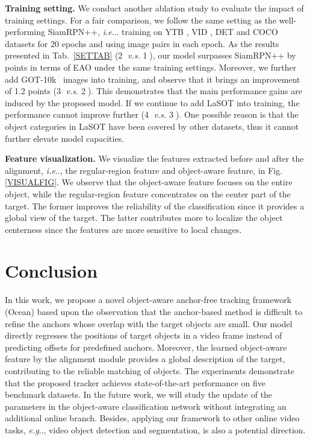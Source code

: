 \documentclass[runningheads]{llncs}
\makeatletter
\DeclareRobustCommand\onedot{\futurelet\@let@token\@onedot}
\def\@onedot{\ifx\@let@token.\else.\null\fi\xspace}
\def\eg{\emph{e.g}\onedot} \def\Eg{\emph{E.g}\onedot}
\def\ie{\emph{i.e}\onedot} \def\Ie{\emph{I.e}\onedot}
\makeatother
\begin{document}
\noindent\textbf{Training setting.} We conduct another ablation study to evaluate the impact of training settings. For a fair comparison, we follow the same setting as the well-performing SiamRPN++\cite{SiamRPN++}, \ie. training on YTB \cite{YTB}, VID \cite{ImageNet}, DET \cite{ImageNet} and COCO \cite{COCO} datasets for 20 epochs and using  image pairs in each epoch. As the results presented in Tab.~\ref{SETTAB} (\textcircled{2} \textit{v.s.} \textcircled{1}), our model surpasses SiamRPN++ by  points in terms of EAO under the same training settings. Moreover, we further add GOT-10k~\cite{GOT10K} images into training, and observe that it brings an improvement of 1.2 points (\textcircled{3} \textit{v.s.} \textcircled{2}). This demonstrates that the main performance gains are induced by the proposed model. If we continue to add LaSOT\cite{LASOT} into training, the performance cannot improve further (\textcircled{4} \textit{v.s.} \textcircled{3}). One possible reason is that the object categories in LaSOT \cite{LASOT} have been covered by other datasets, thus it cannot further elevate model capacities.


\noindent\textbf{Feature visualization.} We visualize the features extracted before and after the alignment, \ie, the regular-region feature and object-aware feature, in Fig. \ref{VISUALFIG}.  We observe that the object-aware feature focuses on the entire object, while the regular-region feature concentrates on the center part of the target. The former improves the reliability of the classification since it provides a global view of the target. The latter contributes more to localize the object centerness since the features are more sensitive to local changes.






\section{Conclusion} \label{Sec6}
In this work, we propose a novel object-aware anchor-free tracking framework (Ocean) based upon the observation that the anchor-based method is difficult to refine the anchors whose overlap with the target objects are small. Our model directly regresses the positions of target objects in a video frame instead of predicting offsets for predefined anchors.  Moreover, the learned object-aware feature by the alignment module provides a global description of the target, contributing to the reliable matching of objects. The experiments demonstrate that the proposed tracker achieves state-of-the-art performance on five benchmark datasets. In the future work, we will study the update of the parameters in the object-aware classification network without integrating an additional online branch. Besides, applying our framework to other online video tasks, \eg, video object detection and segmentation, is also a potential direction.
\end{document}

